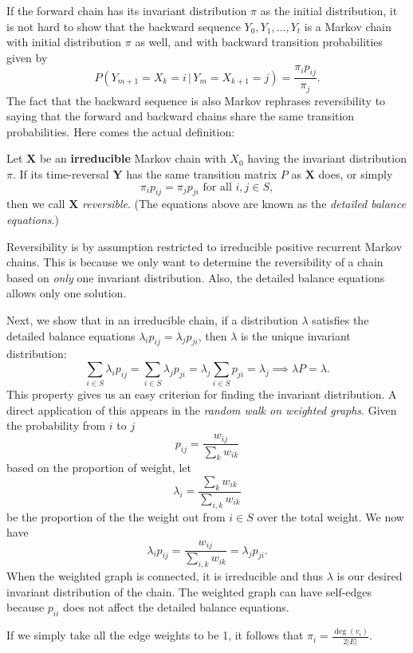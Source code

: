 \documentclass[11pt]{article}
\newcommand{\where}{\,|\,}
\newcommand{\abs}[1]{\lvert #1 \rvert}
\begin{document}
If the forward chain has its invariant distribution $\pi $ as the initial distribution, it is not hard to show that the backward sequence $Y_{0},Y_{1},\dots ,Y_{t}$ is a Markov chain with initial distribution $\pi $ as well, and with backward transition probabilities given by
\[
P(Y_{m+1}=X_{k}=i \where Y_{m}=X_{k+1}=j)=\frac{\pi _{i}p_{ij}}{\pi_{j}}.
\]
The fact that the backward sequence is also Markov rephrases reversibility to saying that the forward and backward chains share the same transition probabilities. Here comes the actual definition:

Let $\mathbf{X}$ be an \textbf{irreducible} Markov chain with $X_{0}$ having the invariant distribution $\pi $. If its time-reversal $\mathbf{Y}$ has the same transition matrix $P$ as $\mathbf{X}$ does, or simply \[
\pi _{i}p_{ij}=\pi _{j}p_{ji} \text{ for all } i,j\in S,\]
then we call $\mathbf{X}$ \textit{reversible}. (The equations above are known as the \textit{detailed balance equations}.)

\noindent {} Reversibility is by assumption restricted to irreducible positive recurrent Markov chains. This is because we only want to determine the reversibility of a chain based on \textit{only} one invariant distribution. Also, the detailed balance equations allows only one solution.

Next, we show that in an irreducible chain, if a distribution $\lambda$ satisfies the detailed balance equations $\lambda _{i}p_{ij}=\lambda _{j}p_{ji}$, then $\lambda $ is the unique invariant distribution:
\[
\sum_{i\in S}\lambda _{i}p_{ij}=\sum_{i\in S}\lambda _{j}p_{ji}=\lambda _{j}\sum_{i\in S}p_{ji}=\lambda _{j} \implies \lambda P=\lambda .
\]
This property gives us an easy criterion for finding the invariant distribution. A direct application of this appears in the \textit{random walk on weighted graphs}. Given the probability from $i$ to $j$
\[
p_{ij}=\frac{w_{ij}}{\sum_{k}w_{ik}}
\]
based on the proportion of weight, let
\[
\lambda _{i}=\frac{\sum_{k}w_{ik}}{\sum_{i,k}w_{ik}}
\]
be the proportion of the the weight out from $i\in S$ over the total weight. We now have
\[
\lambda _{i}p_{ij}=\frac{w_{ij}}{\sum_{i,k}w_{ik}}=\lambda _{j}p_{ji}.
\]
When the weighted graph is connected, it is irreducible and thus $\lambda $ is our desired invariant distribution of the chain. The weighted graph can have self-edges because $p_{ii}$ does not affect the detailed balance equations.

If we simply take all the edge weights to be 1, it follows that $\pi _{i}=\frac{\deg(v_{i})}{2 \abs{E}}$.
\end{document}
